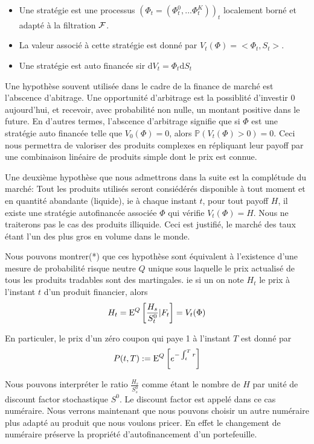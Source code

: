 \begin{defn}
  \begin{itemize}
  \item Une stratégie est une processus $(\Phi_t = (\Phi^0_t, ... \Phi^K_t))_t$ localement borné et adapté à la filtration $\cal{F}$.
  \item La valeur associé à cette stratégie est donné par $V_t(\Phi) = <\Phi_t, S_t>$.
  \item Une stratégie est auto financée sir $\mathrm{d}V_t = \Phi_t \mathrm{d}S_t$
  \end{itemize}

\end{defn}

Une hypothèse souvent utilisée dans le cadre de la finance de marché est l'abscence d'abitrage. Une opportunité d'arbitrage est la possiblité d'investir 0 aujourd'hui, et recevoir, avec probabilité non nulle, un montant positive dans le future. En d'autres termes, l'abscence d'arbitrage signifie que si $\Phi$ est une stratégie auto financée telle que $V_0(\Phi) = 0$, alors $\mathbb{P} ( V_t(\Phi) > 0 ) = 0$. Ceci nous permettra de valoriser des produits complexes en répliquant leur payoff par une combinaison linéaire de produits simple dont le prix est connue.

Une deuxième hypothèse que nous admettrons dans la suite est la complétude du marché: Tout les produits utilisés seront consiédérés disponible à tout moment et en quantité abandante (liquide), ie à chaque instant $t$, pour tout payoff $H$, il existe une stratégie autofinancée associée $\Phi$ qui vérifie $V_t( \Phi ) = H$. Nous ne traiterons pas le cas des produits illiquide. Ceci est justifié, le marché des taux étant l'un des plus gros en volume dans le monde.

Nous pouvons montrer(*) que ces hypothèse sont équivalent à l'existence d'une mesure de probabilité risque neutre $Q$ unique sous laquelle le prix actualisé de tous les produits tradables sont des martingales. ie si un on note $H_t$ le prix à l'instant $t$ d'un produit financier, alors
$$H_t =\mathrm{E}^Q \left[  \frac{H_s}{S^0_t} | F_t  \right] = V_t(\Phi)$$

En particuler, le prix d'un zéro coupon qui paye 1 à l'instant $T$ est donné par
$$ P(t, T) := \mathrm{E}^Q \left[   e^{-\int_t^T r}  \right] $$


Nous pouvons interpréter le ratio $\frac{H_s}{ S^0_s}$ comme étant le nombre  de $H$ par unité de discount factor stochastique $S^0$. Le discount factor est appelé dans ce cas numéraire. Nous verrons maintenant que nous pouvons choisir un autre numéraire plus adapté au produit que nous voulons pricer.
En effet le changement de numéraire préserve la propriété d'autofinancement d'un portefeuille.

